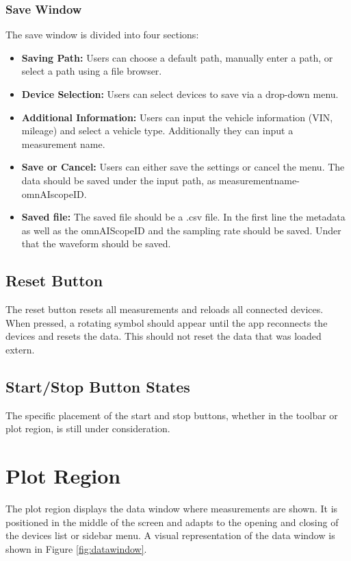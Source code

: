 \documentclass[]{scrreprt}
\begin{document}
\subsubsection{Save Window}
The save window is divided into four sections:
\begin{itemize}
\item \textbf{Saving Path:} Users can choose a default path, manually enter a path, or select a path using a file browser.
\item \textbf{Device Selection:} Users can select devices to save via a drop-down menu.
\item \textbf{Additional Information:} Users can input the vehicle information (VIN, mileage) and select a vehicle type. Additionally they can input a measurement name.
\item \textbf{Save or Cancel:} Users can either save the settings or cancel the menu. The data should be saved under the input path, as measurementname-omnAIscopeID.
\item \textbf{Saved file:} The saved file should be a .csv file. In the first line the metadata as well as the omnAIScopeID and the sampling rate should be saved.
                            Under that the waveform should be saved.
\end{itemize}


\subsection{Reset Button}
The reset button resets all measurements and reloads all connected devices. When pressed, a rotating symbol should appear until the app reconnects the devices and resets the data.
This should not reset the data that was loaded extern.


\subsection{Start/Stop Button States}
The specific placement of the start and stop buttons, whether in the toolbar or plot region, is still under consideration.


\section{Plot Region}


The plot region displays the data window where measurements are shown.
 It is positioned in the middle of the screen and adapts to the opening and closing of the devices list or sidebar menu.
 A visual representation of the data window is shown in Figure \ref{fig:datawindow}.
\end{document}
